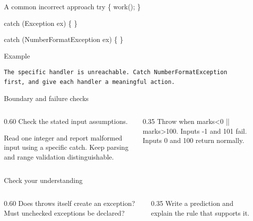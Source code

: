 \documentclass[10pt,aspectratio=169]{beamer}
\begin{document}
\begin{frame}[fragile,t]{A common incorrect approach}
try \{ work(); \}\par catch (Exception ex) \{ \}\par catch (NumberFormatException ex) \{ \}
\vspace{1mm}\begin{block}{Example}
\begin{lstlisting}
The specific handler is unreachable. Catch NumberFormatException first, and give each handler a meaningful action.
\end{lstlisting}
\end{block}
\end{frame}

\begin{frame}[fragile,t]{Boundary and failure checks}
\begin{columns}[T,onlytextwidth]\begin{column}{0.60\textwidth}
Check the stated input assumptions.

Read one integer and report malformed input using a specific catch. Keep parsing and range validation distinguishable.
\end{column}\begin{column}{0.35\textwidth}\small
Throw when marks\textless{}0 || marks\textgreater{}100. Inputs -1 and 101 fail. Inputs 0 and 100 return normally.
\end{column}\end{columns}
\end{frame}

\begin{frame}[fragile,t]{Check your understanding}
\begin{columns}[T,onlytextwidth]\begin{column}{0.60\textwidth}
Does throws itself create an exception? Must unchecked exceptions be declared?
\end{column}\begin{column}{0.35\textwidth}\small
Write a prediction and explain the rule that supports it.
\end{column}\end{columns}
\end{frame}
\end{document}
